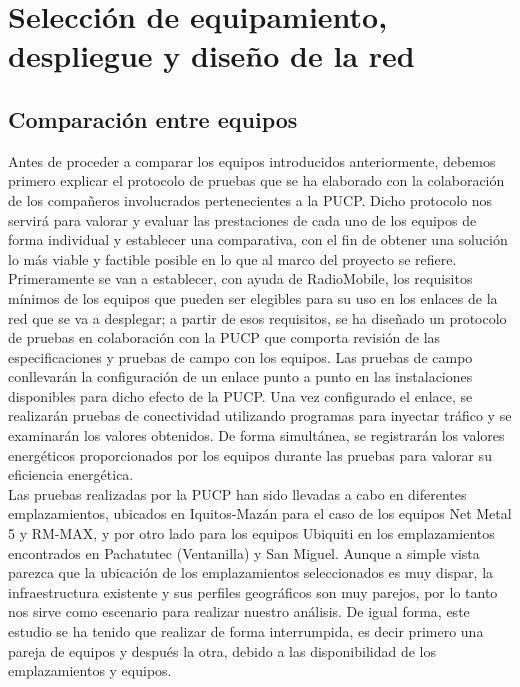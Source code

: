 \chapter{Selección de equipamiento, despliegue y diseño de la red}
\label{cap:equipamiento}

\section{Comparación entre equipos}	
Antes de proceder a comparar los equipos introducidos anteriormente, debemos primero explicar el protocolo de pruebas que se ha elaborado con la colaboración de los compañeros involucrados pertenecientes a la PUCP. Dicho protocolo nos servirá para valorar y evaluar las prestaciones de cada uno de los equipos de forma individual y establecer una comparativa, con el fin de obtener una solución lo más viable y factible posible en lo que al marco del proyecto se refiere. \\

 Primeramente se van a establecer, con ayuda de RadioMobile, los requisitos mínimos de los equipos que pueden ser elegibles para su uso en los enlaces de la red que se va a desplegar; a partir de esos requisitos, se ha diseñado un protocolo de pruebas en colaboración con la PUCP que comporta revisión de las especificaciones y pruebas de campo con los equipos. Las pruebas de campo conllevarán la configuración de un enlace punto a punto en las instalaciones disponibles para dicho efecto de la PUCP. Una vez configurado el enlace, se realizarán pruebas de conectividad utilizando programas para inyectar tráfico y se examinarán los valores obtenidos. De forma simultánea, se registrarán los valores energéticos proporcionados por los equipos durante las pruebas para valorar su eficiencia energética.\\
 
 Las pruebas realizadas por la PUCP han sido llevadas a cabo en diferentes emplazamientos, ubicados en Iquitos-Mazán para el caso de los equipos Net Metal 5 y RM-MAX, y por otro lado para los equipos Ubiquiti en los emplazamientos encontrados en Pachatutec (Ventanilla) y San Miguel. Aunque a simple vista parezca que la ubicación de los emplazamientos seleccionados es muy dispar, la infraestructura existente y sus perfiles geográficos son muy parejos, por lo tanto nos sirve como escenario para realizar nuestro análisis. De igual forma, este estudio se ha tenido que realizar de forma interrumpida, es decir primero una pareja de equipos y después la otra, debido a las disponibilidad de los emplazamientos y equipos.\\
 
